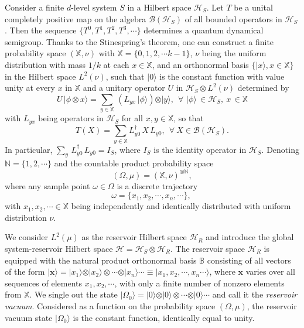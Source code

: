 Consider a finite $d$-level system $S$ in a Hilbert space $\mathcal{H}_S$. Let $T$ be a unital completely positive map on the algebra  $\mathcal{B}(\mathcal{H}_S)$ of all bounded operators in $\mathcal{H}_S$. Then the sequence $\{T^0, T^1, T^2, T^3,\cdots\}$ determines a quantum dynamical semigroup. Thanks to the Stinespring's theorem, one can construct a finite probability space  $(\mathbb{X},\nu)$ with $\mathbb{X}=\{0,1,2,\cdots k-1\}$,  $\nu$ being the uniform distribution with mass $1/k$ at each $x\in\mathbb{X}$, and an orthonormal basis $\{\vert x\rangle, x\in \mathbb{X}\}$ in the Hilbert space $L^2(\nu)$, such that  $\vert 0\rangle$ is the constant function with value unity at every $x$ in $\mathbb{X}$ and a unitary operator $U$ in $\mathcal{H}_S\otimes L^2(\nu)$ determined by 
\begin{equation}
U\, \vert \phi  \otimes  x\rangle = \sum_{y\in \mathbb{X}}\, \left( L_{yx}\,\vert \phi\rangle\right)\otimes \vert y\rangle,\ \  
\forall\,\, \vert\phi\rangle\,\in \mathcal{H}_S,\   x\, \in\mathbb{X} \label{chap5-eq2.1}
\end{equation} 
with $L_{yx}$ being operators in $\mathcal{H}_S$ for all  $x,y\in \mathbb{X}$, so that 
\begin{equation}
T(X)=\sum_{y\in \mathbb{X}} L_{y0}^\dag\, X\, L_{y0},\ \  \forall\ X\in \mathcal{B}(\mathcal{H}_S).  \label{chap5-eq2.2}
\end{equation} 
In particular, $\sum_y\, L^\dag_{y0}\, L_{y0}=I_S$, where $I_S$ is the identity operator in $\mathcal{H}_S$. 
Denoting $\mathbb{N}=\{ 1,2,\cdots\}$ and the countable product probability space 
$$
(\Omega, \mu)=(\mathbb{X}, \nu)^{\otimes \mathbb{N}},
$$
where any sample point $\omega\in \Omega$ is a discrete trajectory 
\begin{equation}
\omega=\{x_1,x_2,\cdots, x_n,\cdots\},\ \label{chap5-eq2.3} 
\end{equation} 
with  $x_1,x_2,\cdots\in\mathbb{X}$ being independently and identically distributed with uniform distribution $\nu$. 

We consider $L^2(\mu)$ as the reservoir Hilbert space $\mathcal{H}_R$ and introduce the global system-reservoir Hilbert space $\mathcal{H}=\mathcal{H}_S\otimes \mathcal{H}_R$. The reservoir space $\mathcal{H}_R$ is equipped with the natural product orthonormal basis $\mathbb{B}$ consisting of all vectors of the form $\vert\mathbf{x}\rangle=\vert x_1\rangle\otimes \vert x_2\rangle\otimes \cdots \otimes\vert x_n\rangle\cdots\equiv \vert x_1, x_2,\cdots , x_n\cdots\rangle$, where $\mathbf{x}$ varies over all sequences of elements $x_1,x_2,\cdots$, with only a finite number of nonzero elements from $\mathbb{X}$.  We single out the state $\vert\Omega_0\rangle=\vert 0\rangle\otimes \vert 0\rangle\otimes \cdots \otimes \vert 0\rangle \cdots$ and call it 
the {\it reservoir vacuum}. Considered as a function on the probability space $(\Omega, \mu)$, the reservoir vacuum state 
$\vert\Omega_0\rangle$ is the constant function, identically equal to unity. 

